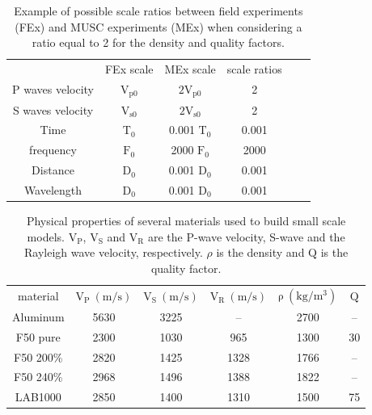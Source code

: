 \documentclass[extra,mreferee]{gji}
\begin{document}
\begin{table}
\centering
\caption{Example of possible scale ratios between field experiments (FEx) and MUSC experiments (MEx) when considering a ratio equal to 2 for the density and quality factors.}
\begin{tabular}{cccccc}
\quad & FEx scale & MEx scale & scale ratios \\
P waves velocity & $\mathrm{V_{p 0}}$ & $\mathrm{2V_{p 0}}$ & 2 \\
S waves velocity & $\mathrm{V_{s 0}}$ & $\mathrm{2V_{s 0}}$ & 2 \\
Time & $\mathrm{T_{0}}$ & 0.001 $\mathrm{T_{0}}$ & 0.001 \\
frequency & $\mathrm{F_{0}}$ & 2000 $\mathrm{F_{0}}$ & 2000 \\
Distance & $\mathrm{D_{0}}$ & 0.001 $\mathrm{D_{0}}$ & 0.001 \\
Wavelength & $\mathrm{D_{0}}$ & 0.001 $\mathrm{D_{0}}$ & 0.001 \\
\end{tabular}
\label{epoxy-resin}
\end{table}

\clearpage
\newpage

\begin{table}
\centering
\caption{Physical properties of several materials used to build small scale models. $\mathrm{V_{P}}$, $\mathrm{V_{S}}$ and $\mathrm{V_{R}}$ are the P-wave velocity, S-wave and the Rayleigh wave velocity, respectively. $\rho$ is the density and $\mathrm{Q}$ is the quality factor.}
\begin{tabular}{cccccc}
material & $\mathrm{V_{P}\ (m/s)}$ & $\mathrm{V_{S}\ (m/s)}$ & $\mathrm{V_{R}\ (m/s)}$ & $\mathrm{\rho\ (kg/m^{3})}$ & $\mathrm{Q}$ \\
Aluminum & 5630 & 3225 & -- & 2700 & -- \\
F50 pure & 2300 & 1030 & 965 & 1300 & 30 \\
F50 200\% & 2820 & 1425 & 1328 & 1766 & -- \\
F50 240\% & 2968 & 1496 & 1388 & 1822 & -- \\
LAB1000 & 2850 & 1400 & 1310 & 1500 & 75 \\
\end{tabular}
\label{epoxy-resin}
\end{table}

\clearpage
\newpage
\end{document}
